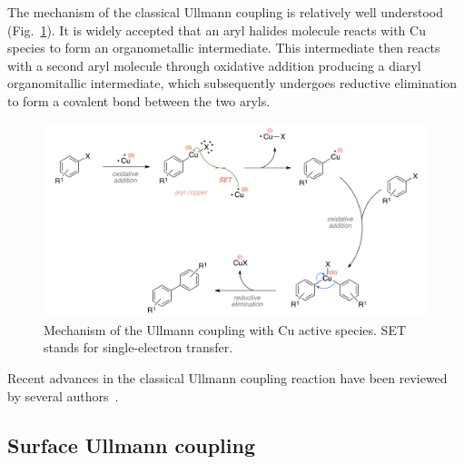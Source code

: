 \documentclass[%
 reprint,
 amsmath,amssymb,
 aps,
prb,
]{revtex4-2}
\begin{document}
The mechanism of the classical Ullmann coupling is relatively well understood (Fig.~\ref{fig:classical}).
It is widely accepted that an aryl halides molecule reacts with Cu species to form an organometallic intermediate. This intermediate then reacts with a second aryl molecule through oxidative addition producing a diaryl organomitallic intermediate, which subsequently undergoes reductive elimination to form a covalent bond between the two aryls. 

\begin{figure}[htb]
\centering
\includegraphics[width=1.0\columnwidth]{Fig/classical-mechanism.png}
\caption{Mechanism of the Ullmann coupling with Cu active species. SET stands for single-electron transfer. %
}
\label{fig:classical}
\end{figure}

Recent advances in the classical Ullmann coupling reaction have been reviewed by several authors~\cite{ullmann_29,ullmann_30,ullmann_31,ullmann_32}.

\subsection{Surface Ullmann coupling}
\end{document}
